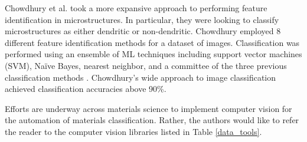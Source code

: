 Chowdhury et al. took a more expansive approach to performing feature identification in microstructures. In particular, they were looking to classify microstructures as either dendritic or non-dendritic. Chowdhury employed 8 different feature identification methods for a dataset of images. Classification was performed using an ensemble of ML techniques including support vector machines (SVM), Na\"ive Bayes, nearest neighbor, and a committee of the three previous classification methods \cite{Chowdhury2016}. Chowdhury's wide approach to image classification achieved classification accuracies above 90\%. 

Efforts are underway across materials science to implement computer vision for the automation of materials classification. Rather, the authors would like to refer the reader to the computer vision libraries listed in Table \ref{data_tools}. 

